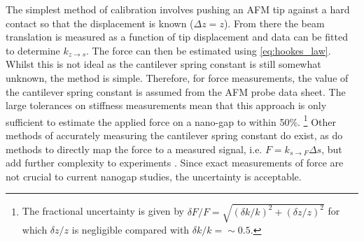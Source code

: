 \documentclass{article}
\begin{document}
The simplest method of calibration involves pushing an AFM tip against a hard contact so that the displacement is known ($\Delta z = z$). From there the beam translation is measured as a function of tip displacement and data can be fitted to determine $k_{z \rightarrow s}$. The force can then be estimated using \eqref{eq:hookes_law}. Whilst this is not ideal as the cantilever spring constant is still somewhat unknown, the method is simple. Therefore, for force measurements, the value of the cantilever spring constant is assumed from the AFM probe data sheet. The large tolerances on stiffness measurements mean that this approach is only sufficient to estimate the applied force on a nano-gap to within 50\%.%
\footnote{The fractional uncertainty is given by  $\delta F/F = \sqrt{(\delta k/k)^2+(\delta z/z)^2}$ for which $\delta z/z$ is negligible compared with $\delta k/k=\sim0.5$.}
Other methods of accurately measuring the cantilever spring constant do exist, as do methods to directly map the force to a measured signal, i.e. $F = k_{s \rightarrow F}\Delta s$, but add further complexity to experiments \cite{hutter1993calibration, senden1994experimental, torii1996method, sader1999calibration, levy2002measuring, cumpson2004quantitative, gates2007precise, langlois2007spring, ohler2007cantilever}. Since exact measurements of force are not crucial to current nanogap studies, the uncertainty is acceptable.

\FloatBarrier
\end{document}
